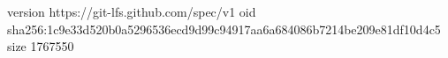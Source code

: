 version https://git-lfs.github.com/spec/v1
oid sha256:1c9e33d520b0a5296536ecd9d99c94917aa6a684086b7214be209e81df10d4c5
size 1767550
